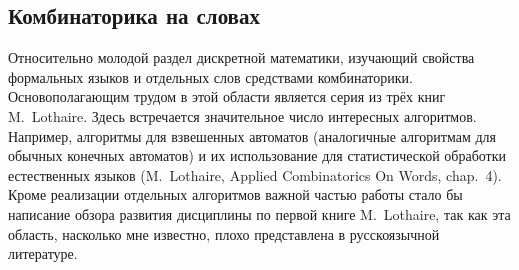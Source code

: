 \documentclass{article}
\begin{document}
\subsection{Комбинаторика на словах}
Относительно молодой раздел дискретной математики, изучающий свойства формальных языков и отдельных слов средствами комбинаторики. Основополагающим трудом в этой области является серия из трёх книг M.~Lothaire. Здесь встречается значительное число интересных алгоритмов. Например, алгоритмы для взвешенных автоматов (аналогичные алгоритмам для обычных конечных автоматов) и их использование для статистической обработки естественных языков (\textenglish{M.~Lothaire, Applied Combinatorics On Words, chap.~4}). Кроме реализации отдельных алгоритмов важной частью работы стало бы написание обзора развития дисциплины по первой книге M.~Lothaire, так как эта область, насколько мне известно, плохо представлена в русскоязычной литературе. 
\end{document}
